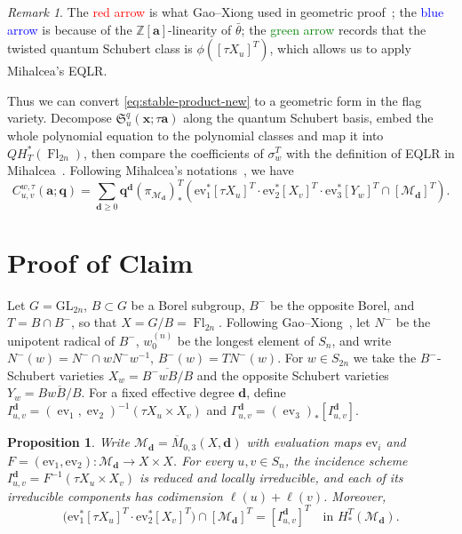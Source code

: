 \documentclass[12pt]{amsart}
\newtheorem{proposition}[theorem]{Proposition}
\theoremstyle{definition}
\theoremstyle{remark}
\newtheorem*{remark}{Remark}
\DeclareMathOperator{\ev}{ev}
\DeclareMathOperator{\Fl}{Fl}
\begin{document}
\begin{remark}
The \textcolor{red}{red arrow} is what Gao--Xiong used in geometric proof~\cite{GX}; the \textcolor{blue}{blue arrow} is because of the \(\mathbb{Z}[\mathbf{a}]\)-linearity of \(\bar{\theta}\); the \textcolor{Green}{green arrow} records that the twisted quantum Schubert class is \(\phi([\tau X_u]^T)\),  which allows us to apply Mihalcea’s EQLR.
\end{remark}

Thus we can convert \eqref{eq:stable-product-new} to a geometric form in the flag variety. Decompose \(\mathfrak S_u^q(\mathbf x;\tau\mathbf a)\) along the quantum Schubert basis, embed the whole polynomial equation to the polynomial classes and map it into \(QH_T^*(\Fl_{2n})\), then compare the coefficients of \(\sigma_w^T\) with the definition of EQLR in Mihalcea~\cite[Section~5]{Mih}. Following Mihalcea's notations~\cite{Mih}, we have
\begin{equation}\label{eq:EQLR}
C_{u,v}^{w,\tau}(\mathbf a;\mathbf q)=
\sum_{\mathbf d\geq 0 } \mathbf{q}^{\mathbf d}
 (\pi_{\mathcal{M}_{\mathbf d}})_{*}^{T} \left( \text{ev}_{1}^{*}[\tau X_{u}]^{T} \cdot \text{ev}_{2}^{*}[X_{v}]^{T} \cdot \text{ev}_{3}^{*}[Y_{w}]^{T} \cap [\mathcal{M}_{\mathbf d}]^{T} \right).
\end{equation}

\section{Proof of Claim}

Let \(G=\mathrm{GL}_{2n}\), \(B\subset G\) be a Borel subgroup, 
\(B^-\) be the opposite Borel, and \(T=B\cap B^-\), so that
\(X=G/B=\Fl_{2n}\). Following Gao--Xiong~\cite{GX}, let \(N^-\) be the
unipotent radical of \(B^-\), \(w_0^{(n)}\) be the longest element of
\(S_{n}\), and write \(N^-(w)=N^-\cap wN^-w^{-1}\),
\(B^-(w)=TN^-(w)\). For \(w\in S_{2n}\) we take the \(B^-\)-Schubert
varieties \(X_w=\overline{B^-wB/B}\) and the opposite Schubert varieties
\(Y_w=\overline{BwB/B}\). For a fixed effective degree \(\mathbf{d}\),
define \(I_{u,v}^{\mathbf{d}}=(\ev_1,\ev_2)^{-1}(\tau X_u\times X_v)\) and
\(\Gamma_{u,v}^{\mathbf{d}}=(\ev_3)_*[I_{u,v}^{\mathbf{d}}]\).

\begin{proposition}
\label{prop:incidence}
Write
\(\mathcal{M}_{\mathbf{d}}=\overline{M}_{0,3}(X,\mathbf{d})\) with evaluation
maps \(\mathrm{ev}_i\) and
\(F=(\mathrm{ev}_1,\mathrm{ev}_2):\mathcal{M}_{\mathbf{d}}\to X\times X\).
For every \(u,v\in S_n\), the incidence scheme
\(I_{u,v}^{\mathbf{d}}=F^{-1}(\tau X_u\times X_v)\) is reduced and locally
irreducible, and each of its irreducible components has codimension
\(\ell(u)+\ell(v)\). Moreover,
\begin{equation}
\label{eq:expected-pullback}
\bigl(\mathrm{ev}_1^*[\tau X_u]^T\cdot
\mathrm{ev}_2^*[X_v]^T\bigr)\cap[\mathcal{M}_{\mathbf{d}}]^T
=[I_{u,v}^{\mathbf{d}}]^T
\quad\text{in }H_*^T(\mathcal{M}_{\mathbf{d}}).
\end{equation}
\end{proposition}
\end{document}
